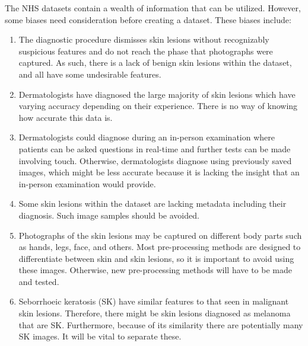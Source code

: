 The NHS datasets contain a wealth of information that can be utilized. However, some biases need consideration before creating a dataset. These biases include:
\begin{enumerate}
    \item  The diagnostic procedure dismisses skin lesions without recognizably suspicious features and do not reach the phase that photographs were captured. As such, there is a lack of benign skin lesions within the dataset, and all have some undesirable features.
    \item Dermatologists have diagnosed the large majority of skin lesions which have varying accuracy depending on their experience. There is no way of knowing how accurate this data is.
    \item Dermatologists could diagnose during an in-person examination where patients can be asked questions in real-time and further tests can be made involving touch. Otherwise, dermatologists diagnose using previously saved images, which might be less accurate because it is lacking the insight that an in-person examination would provide.
    \item Some skin lesions within the dataset are lacking metadata including their diagnosis. Such image samples should be avoided.
    \item Photographs of the skin lesions may be captured on different body parts such as hands, legs, face, and others. Most pre-processing methods are designed to differentiate between skin and skin lesions, so it is important to avoid using these images. Otherwise, new pre-processing methods will have to be made and tested.
    \item Seborrhoeic keratosis (SK) have similar features to that seen in malignant skin lesions. Therefore, there might be skin lesions diagnosed as melanoma that are SK. Furthermore, because of its similarity there are potentially many SK images. It will be vital to separate these.
\end{enumerate}

